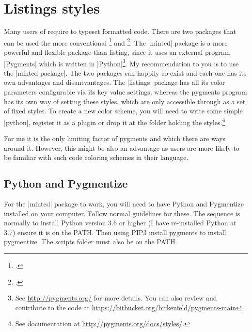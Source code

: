 \makeatletter

\thispagestyle{plain}



\chapter{Listings styles}  

Many users of \latex require to typeset formatted code. There are two packages that
can be used the more conventional \footcite{listings} and \footcite{minted}. The
|minted| package is a more powerful and flexible package than listing, since it uses
an external program |Pygments| which is written in |Python|\footnote{See \protect\url{http://pygments.org/} for more details. You can also review and contribute to the code at \protect\url{https://bitbucket.org/birkenfeld/pygments-main}}. My recommendation to you is
to use the |minted package|. The two packages can happily co-exist and each one has
its own advantages and disantvantages. The |listings| package has all its color
parameters configurable via its \latexe key value settings, whereas the pygments program
has its own way of setting these styles, which are only accessible through \latexe
as a set of fixed styles. To create a new color scheme, you will need to write some
simple |python|, register it as a plugin or drop it at the folder holding the styles.\footnote{See documentation at \protect\url{http://pygments.org/docs/styles/}.}

For me it is the only limiting factor of pygments and which there are ways around it. However, this might be also an advantage
as users are more likely to be familiar with such code coloring schemes in their language.

\section{Python and Pygmentize}

For the |minted| package to work, you will need to have Python and Pygmentize installed on your computer. Follow normal guidelines for these. The sequence is normally to install Python version 3.6 or higher (I have re-installed Python at 3.7) ensure it is on the PATH. Then using PIP3 install pygments to install pygmentize. The scripts folder must also be on the PATH. 

